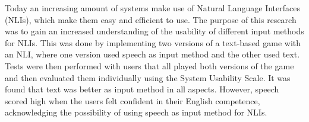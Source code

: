 Today an increasing amount of systems make use of Natural Language Interfaces (NLIs), which make them easy and efficient to use. The purpose of this research was to gain an increased understanding of the usability of different input methods for NLIs. This was done by implementing two versions of a text-based game with an NLI, where one version used speech as input method and the other used text. Tests were then performed with users that all played both versions of the game and then evaluated them individually using the System Usability Scale. It was found that text was better as input method in all aspects. However, speech scored high when the users felt confident in their English competence, acknowledging the possibility of using speech as input method for NLIs.
